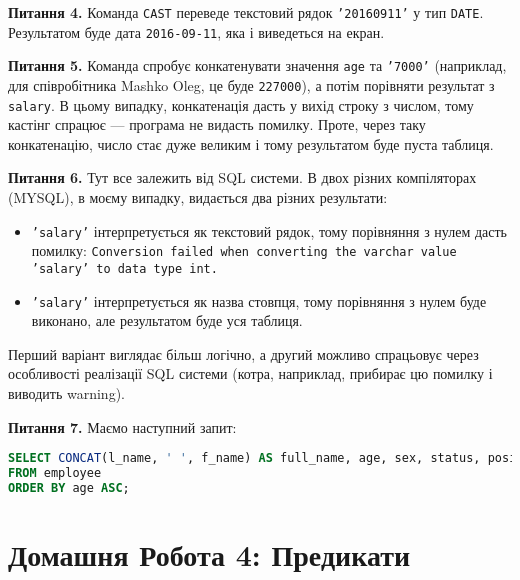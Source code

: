 \documentclass{hw_template}
\begin{document}
\textbf{Питання 4.} Команда \texttt{CAST} переведе текстовий рядок \texttt{'20160911'} у
тип \texttt{DATE}. Результатом буде дата \texttt{2016-09-11}, яка і виведеться на екран.

\textbf{Питання 5.} Команда спробує конкатенувати значення \texttt{age} та \texttt{'7000'} (наприклад, для 
співробітника Mashko Oleg, це буде \texttt{227000}), а потім порівняти результат з \texttt{salary}. В цьому 
випадку, конкатенація дасть у вихід строку з числом, тому кастінг спрацює --- програма не видасть помилку. 
Проте, через таку конкатенацію, число стає дуже великим і тому результатом буде пуста таблиця.

\textbf{Питання 6.} Тут все залежить від SQL системи. В двох різних компіляторах
(MYSQL), в моєму випадку, видається два різних результати:
\begin{itemize}
    \item \texttt{'salary'} інтерпретується як текстовий рядок, тому порівняння
    з нулем дасть помилку: \texttt{Conversion failed when converting the varchar
    value 'salary' to data type int.}
    \item \texttt{'salary'} інтерпретується як назва стовпця, тому порівняння
    з нулем буде виконано, але результатом буде уся таблиця.
\end{itemize}

Перший варіант виглядає більш логічно, а другий можливо спрацьовує через
особливості реалізації SQL системи (котра, наприклад, прибирає цю помилку і 
виводить warning).

\textbf{Питання 7.} Маємо наступний запит:
\begin{lstlisting}[language=SQL]
SELECT CONCAT(l_name, ' ', f_name) AS full_name, age, sex, status, position
FROM employee
ORDER BY age ASC;
\end{lstlisting}

\newpage

\section{Домашня Робота 4: Предикати}
\end{document}
